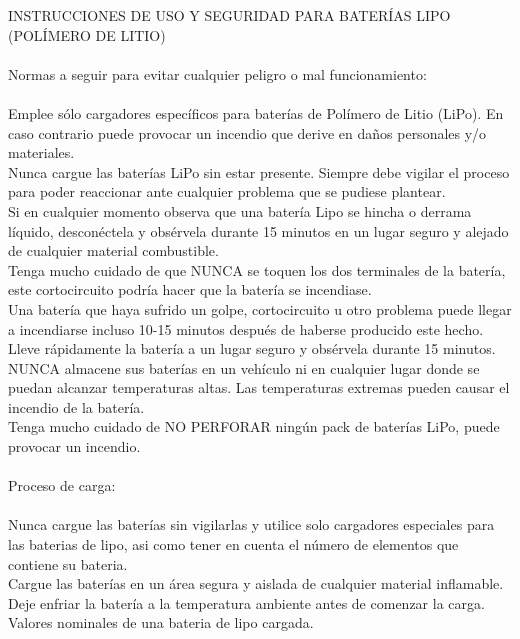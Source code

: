 \documentclass[a4paper,usenames,dvipsnames,svgnames,table]{book}
\begin{document}
INSTRUCCIONES DE USO Y SEGURIDAD PARA BATERÍAS LIPO (POLÍMERO DE LITIO)\\
\\
Normas a seguir para evitar cualquier peligro o mal funcionamiento:\\
\\
    Emplee sólo cargadores específicos para baterías de Polímero de Litio (LiPo). En caso contrario puede provocar un 
    incendio que derive en daños personales y/o materiales.\\
    Nunca cargue las baterías LiPo sin estar presente. Siempre debe vigilar el proceso para poder reaccionar ante cualquier
    problema que se pudiese plantear.\\
    Si en cualquier momento observa que una batería Lipo se hincha o derrama líquido, desconéctela y obsérvela durante 15
    minutos en un lugar seguro y alejado de cualquier material combustible.\\
    Tenga mucho cuidado de que NUNCA se toquen los dos terminales de la batería, este cortocircuito podría hacer que la 
    batería se incendiase.\\
    Una batería que haya sufrido un golpe, cortocircuito u otro problema puede llegar a incendiarse incluso 10-15 minutos 
    después de haberse producido este hecho. Lleve rápidamente la batería a un lugar seguro y obsérvela durante 15 minutos.\\
    NUNCA almacene sus baterías en un vehículo ni en cualquier lugar donde se puedan alcanzar temperaturas altas. Las 
    temperaturas extremas pueden causar el incendio de la batería.\\
    Tenga mucho cuidado de NO PERFORAR ningún pack de baterías LiPo, puede provocar un incendio.\\
    \\
Proceso de carga:\\
\\
    Nunca cargue las baterías sin vigilarlas y utilice solo cargadores especiales para las baterias de lipo, asi como tener
    en cuenta el número de elementos que contiene su bateria.\\
    Cargue las baterías en un área segura y aislada de cualquier material inflamable.\\
    Deje enfriar la batería a la temperatura ambiente antes de comenzar la carga.\\
    Valores nominales de una bateria de lipo cargada.\\
\\
\end{document}
